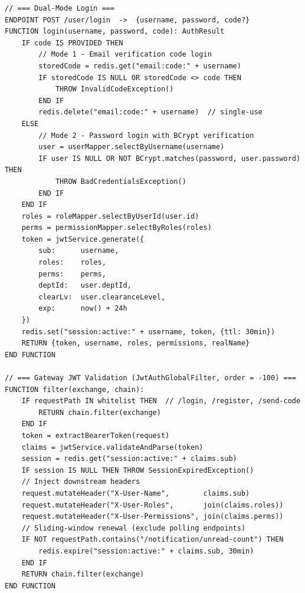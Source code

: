 \begin{table}[H]
\small\singlespacing
\centering
\caption{Pseudocode --- Dual-Mode Login and JWT Session Management}
\label{tab:pseudocode-login}
\vspace{2mm}

\begin{lstlisting}
// === Dual-Mode Login ===
ENDPOINT POST /user/login  ->  {username, password, code?}
FUNCTION login(username, password, code): AuthResult
    IF code IS PROVIDED THEN
        // Mode 1 - Email verification code login
        storedCode = redis.get("email:code:" + username)
        IF storedCode IS NULL OR storedCode <> code THEN
            THROW InvalidCodeException()
        END IF
        redis.delete("email:code:" + username)  // single-use
    ELSE
        // Mode 2 - Password login with BCrypt verification
        user = userMapper.selectByUsername(username)
        IF user IS NULL OR NOT BCrypt.matches(password, user.password) THEN
            THROW BadCredentialsException()
        END IF
    END IF
    roles = roleMapper.selectByUserId(user.id)
    perms = permissionMapper.selectByRoles(roles)
    token = jwtService.generate({
        sub:      username,
        roles:    roles,
        perms:    perms,
        deptId:   user.deptId,
        clearLv:  user.clearanceLevel,
        exp:      now() + 24h
    })
    redis.set("session:active:" + username, token, {ttl: 30min})
    RETURN {token, username, roles, permissions, realName}
END FUNCTION

// === Gateway JWT Validation (JwtAuthGlobalFilter, order = -100) ===
FUNCTION filter(exchange, chain):
    IF requestPath IN whitelist THEN  // /login, /register, /send-code
        RETURN chain.filter(exchange)
    END IF
    token = extractBearerToken(request)
    claims = jwtService.validateAndParse(token)
    session = redis.get("session:active:" + claims.sub)
    IF session IS NULL THEN THROW SessionExpiredException()
    // Inject downstream headers
    request.mutateHeader("X-User-Name",        claims.sub)
    request.mutateHeader("X-User-Roles",       join(claims.roles))
    request.mutateHeader("X-User-Permissions", join(claims.perms))
    // Sliding-window renewal (exclude polling endpoints)
    IF NOT requestPath.contains("/notification/unread-count") THEN
        redis.expire("session:active:" + claims.sub, 30min)
    END IF
    RETURN chain.filter(exchange)
END FUNCTION
\end{lstlisting}
\end{table}


